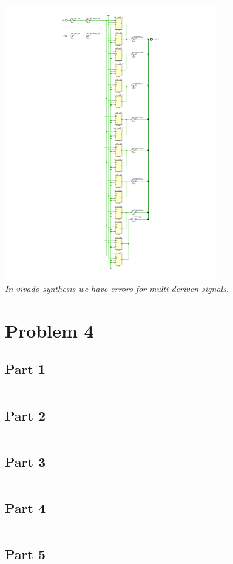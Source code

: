 \documentclass[paper=a4, fontsize=11pt]{scrartcl} %
\numberwithin{equation}{section} %
\numberwithin{figure}{section} %
\numberwithin{table}{section} %
\begin{document}
\includegraphics[height=12cm]{src/p3/schematic.png}\\

\textit{In vivado synthesis we have errors for multi deriven signals.}


\section{Problem 4}
\subsection{Part 1}
\inputminted{vhdl}{src/p4-1-2/p4-1.vhd}
\subsection{Part 2}
\inputminted{vhdl}{src/p4-1-2/p4-2.vhd}
\subsection{Part 3}
\inputminted{vhdl}{src/p4-3/p4-3.vhd}
\subsection{Part 4}
\inputminted{vhdl}{src/p4-4/p4-4.vhd}
\subsection{Part 5}
\inputminted{vhdl}{src/p4-5/p4-5.vhd}
\end{document}
